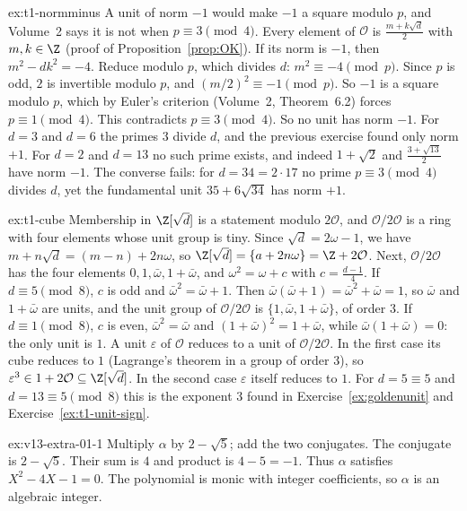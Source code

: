 \begin{solution}{ex:t1-normminus}
\idea A unit of norm $-1$ would make $-1$ a square modulo $p$, and Volume~2 says it is not when $p\equiv3\pmod4$.
\writeup Every element of $\mathcal O$ is $\frac{m+k\sqrt d}2$ with $m,k\in\Z$ (proof of Proposition~\ref{prop:OK}). If its norm is $-1$, then $m^2-dk^2=-4$. Reduce modulo $p$, which divides $d$: $m^2\equiv-4\pmod p$. Since $p$ is odd, $2$ is invertible modulo $p$, and $(m/2)^2\equiv-1\pmod p$. So $-1$ is a square modulo $p$, which by Euler's criterion (Volume~2, Theorem~6.2) forces $p\equiv1\pmod4$. This contradicts $p\equiv3\pmod4$. So no unit has norm $-1$. For $d=3$ and $d=6$ the primes $3$ divide $d$, and the previous exercise found only norm $+1$. For $d=2$ and $d=13$ no such prime exists, and indeed $1+\sqrt2$ and $\frac{3+\sqrt{13}}2$ have norm $-1$. The converse fails: for $d=34=2\cdot17$ no prime $p\equiv3\pmod4$ divides $d$, yet the fundamental unit $35+6\sqrt{34}$ has norm $+1$.
\end{solution}

\begin{solution}{ex:t1-cube}
\idea Membership in $\Z[\sqrt d]$ is a statement modulo $2\mathcal O$, and $\mathcal O/2\mathcal O$ is a ring with four elements whose unit group is tiny.
\writeup Since $\sqrt d=2\omega-1$, we have $m+n\sqrt d=(m-n)+2n\omega$, so $\Z[\sqrt d]=\{a+2n\omega\}=\Z+2\mathcal O$. Next, $\mathcal O/2\mathcal O$ has the four elements $0,1,\bar\omega,1+\bar\omega$, and $\omega^2=\omega+c$ with $c=\frac{d-1}4$. If $d\equiv5\pmod8$, $c$ is odd and $\bar\omega^2=\bar\omega+1$. Then $\bar\omega(\bar\omega+1)=\bar\omega^2+\bar\omega=1$, so $\bar\omega$ and $1+\bar\omega$ are units, and the unit group of $\mathcal O/2\mathcal O$ is $\{1,\bar\omega,1+\bar\omega\}$, of order $3$. If $d\equiv1\pmod8$, $c$ is even, $\bar\omega^2=\bar\omega$ and $(1+\bar\omega)^2=1+\bar\omega$, while $\bar\omega(1+\bar\omega)=0$: the only unit is $1$. A unit $\varepsilon$ of $\mathcal O$ reduces to a unit of $\mathcal O/2\mathcal O$. In the first case its cube reduces to $1$ (Lagrange's theorem in a group of order $3$), so $\varepsilon^3\in1+2\mathcal O\subseteq\Z[\sqrt d]$. In the second case $\varepsilon$ itself reduces to $1$. For $d=5\equiv5$ and $d=13\equiv5\pmod8$ this is the exponent $3$ found in Exercise~\ref{ex:goldenunit} and Exercise~\ref{ex:t1-unit-sign}.
\end{solution}

\begin{solution}{ex:v13-extra-01-1}
\idea Multiply $\alpha$ by $2-\sqrt5$; add the two conjugates.
\writeup The conjugate is $2-\sqrt5$. Their sum is $4$ and product is $4-5=-1$. Thus $\alpha$ satisfies $X^2-4X-1=0$. The polynomial is monic with integer coefficients, so $\alpha$ is an algebraic integer.
\end{solution}

